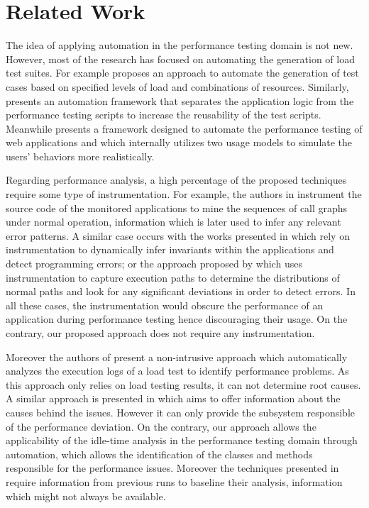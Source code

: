 \documentclass[runningheads,a4paper]{llncs}
\newcommand{\myspaceM}{-7.6pt}
\begin{document}

\vspace{\myspaceM{}}
\section{Related Work}
\label{RelatedWork}
\vspace{\myspaceM{}}
The idea of applying automation in the performance testing domain is not new.
However, most of the research has focused on automating the generation of load
test
suites\cite{Elvira1,Bayan1,Zhang1,Briand1,Chen1,Garousi1,Xingen1}.
For example \cite{Bayan1} proposes an approach to automate the generation of test 
cases based on specified levels of load and combinations of resources.
Similarly, \cite{Chen1} presents an automation framework that separates the
application logic from the performance testing scripts to increase the
reusability of the test scripts. Meanwhile \cite{Xingen1} presents a framework
designed to automate the performance testing of web applications
and which internally utilizes two usage models to simulate the users’ behaviors
more realistically.

Regarding performance analysis, a high percentage of the proposed
techniques require some type of instrumentation. For example, the authors in
\cite{Yang1} instrument the source code of the monitored applications to mine
the sequences of call graphs under normal operation, information which is
later used to infer any relevant error patterns. A similar case occurs with
the works presented in \cite{Hangal1,Csallner1} which rely on instrumentation to dynamically 
infer invariants within the applications and detect programming errors; or the
approach proposed by \cite{Chen2} which uses instrumentation to capture execution paths to determine
the distributions of normal paths and look for any significant deviations in
order to detect errors. In all these cases, the instrumentation would obscure
the performance of an application during performance testing hence discouraging
their usage. On the contrary, our proposed approach does not require any
instrumentation.

Moreover the authors of \cite{Jiang2009} present a non-intrusive approach which
automatically analyzes the execution logs of a load test to identify performance
problems. As this approach only relies on load testing results, it can not
determine root causes. A similar approach is presented in \cite{Malik1} which
aims to offer information about the causes behind the issues. However it can
only provide the subsystem responsible of the performance deviation. On the
contrary, our approach allows the applicability of the idle-time analysis in the
performance testing domain through automation, which allows the identification
of the classes and methods responsible for the performance issues. Moreover the
techniques presented in \cite{Jiang2009,Malik1} require information from previous runs 
to baseline their analysis, information which might not always be available.
\end{document}

